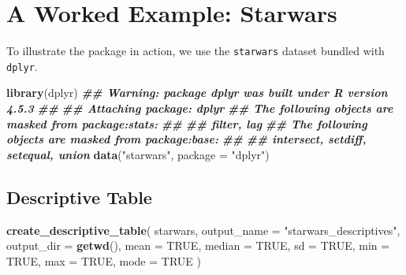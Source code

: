 \documentclass[
]{article}
\newenvironment{Shaded}{\begin{snugshade}}{\end{snugshade}}
\newcommand{\AttributeTok}[1]{\textcolor[rgb]{0.13,0.29,0.53}{#1}}
\newcommand{\ConstantTok}[1]{\textcolor[rgb]{0.56,0.35,0.01}{#1}}
\newcommand{\DocumentationTok}[1]{\textcolor[rgb]{0.56,0.35,0.01}{\textbf{\textit{#1}}}}
\newcommand{\FunctionTok}[1]{\textcolor[rgb]{0.13,0.29,0.53}{\textbf{#1}}}
\newcommand{\NormalTok}[1]{#1}
\newcommand{\StringTok}[1]{\textcolor[rgb]{0.31,0.60,0.02}{#1}}
\begin{document}
\section{A Worked Example: Starwars}\label{a-worked-example-starwars}

To illustrate the package in action, we use the \texttt{starwars}
dataset bundled with \texttt{dplyr}.

\begin{Shaded}
\begin{Highlighting}[]
\FunctionTok{library}\NormalTok{(dplyr)}
\DocumentationTok{\#\# Warning: package \textquotesingle{}dplyr\textquotesingle{} was built under R version 4.5.3}
\DocumentationTok{\#\# }
\DocumentationTok{\#\# Attaching package: \textquotesingle{}dplyr\textquotesingle{}}
\DocumentationTok{\#\# The following objects are masked from \textquotesingle{}package:stats\textquotesingle{}:}
\DocumentationTok{\#\# }
\DocumentationTok{\#\#     filter, lag}
\DocumentationTok{\#\# The following objects are masked from \textquotesingle{}package:base\textquotesingle{}:}
\DocumentationTok{\#\# }
\DocumentationTok{\#\#     intersect, setdiff, setequal, union}
\FunctionTok{data}\NormalTok{(}\StringTok{"starwars"}\NormalTok{, }\AttributeTok{package =} \StringTok{"dplyr"}\NormalTok{)}
\end{Highlighting}
\end{Shaded}

\subsection{Descriptive Table}\label{descriptive-table}

\begin{Shaded}
\begin{Highlighting}[]
\FunctionTok{create\_descriptive\_table}\NormalTok{(}
\NormalTok{  starwars,}
  \AttributeTok{output\_name =} \StringTok{"starwars\_descriptives"}\NormalTok{,}
  \AttributeTok{output\_dir  =} \FunctionTok{getwd}\NormalTok{(),}
  \AttributeTok{mean        =} \ConstantTok{TRUE}\NormalTok{,}
  \AttributeTok{median      =} \ConstantTok{TRUE}\NormalTok{,}
  \AttributeTok{sd          =} \ConstantTok{TRUE}\NormalTok{,}
  \AttributeTok{min         =} \ConstantTok{TRUE}\NormalTok{,}
  \AttributeTok{max         =} \ConstantTok{TRUE}\NormalTok{,}
  \AttributeTok{mode        =} \ConstantTok{TRUE}
\NormalTok{)}
\end{Highlighting}
\end{Shaded}
\end{document}
